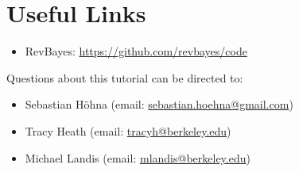 \bigskip
\section*{Useful Links}

\begin{itemize}
\item RevBayes: \href{https://github.com/revbayes/code}{https://github.com/revbayes/code} \\ \vspace{-7mm}
\end{itemize}

Questions about this tutorial can be directed to: \\\vspace{-10mm}
\begin{itemize}
\item Sebastian H\"{o}hna (email: \href{mailto:sebastian.hoehna@gmail.com}{sebastian.hoehna@gmail.com}) \\\vspace{-8mm} 
\item Tracy Heath (email: \href{mailto:tracyh@berkeley.edu}{tracyh@berkeley.edu}) \\\vspace{-8mm}
\item Michael Landis (email: \href{mailto:mlandis@berkeley.edu}{mlandis@berkeley.edu})
\end{itemize}

\nocite{rannala96,robert02,Rubinstein1981,Smith1993,yang97b}

